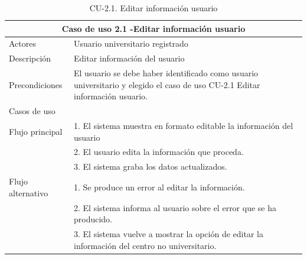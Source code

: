 \begin{table}[H]
    \caption{CU-2.1. Editar información usuario}
    \label{tab:CU-2.1}
    \begin{center}
        \begin{tabular}{|l|p{12cm}|}
            \hline
            \multicolumn{2}{|c|}{Caso de uso 2.1 -Editar información usuario} \\ \hline \hline
            Actores                 &   Usuario universitario registrado          \\  \hline
            Descripción             &   Editar información  del usuario \\  \hline
            Precondiciones          &   El usuario se debe haber identificado como usuario universitario y elegido el caso de uso CU-2.1 Editar información usuario. \\
            \hline
            Casos de uso            &             \\  \hline
            Flujo principal         &   1. El sistema muestra en formato editable la información del usuario   \\
            &   2. El usuario edita la información que proceda.    \\ 
            & 3. El sistema graba los datos actualizados. \\ \hline
            Flujo alternativo    &   1. Se produce un error al editar la información. \\
            & 2. El sistema informa al usuario sobre el error que se ha producido. \\
            & 3. El sistema vuelve a mostrar la opción de editar la información del centro no universitario.
             \\  \hline
        \end{tabular}
    \end{center}
\end{table}

